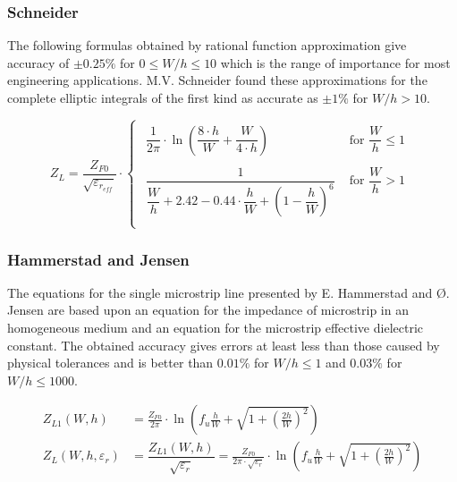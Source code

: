 \documentclass[10pt]{report}
\begin{document}
\subsubsection{Schneider}

The following formulas obtained by rational function approximation
give accuracy of $\pm 0.25\%$ for $0 \le W/h \le 10$ which is the
range of importance for most engineering applications.  M.V. Schneider
\cite{Schneider} found these approximations for the complete elliptic
integrals of the first kind as accurate as $\pm 1\%$ for $W/h > 10$.

\begin{equation}
Z_L = \dfrac{Z_{F0}}{\sqrt{\varepsilon_{r_{eff}}}}\cdot
\begin{cases}
\begin{array}{ll}
\dfrac{1}{2\pi}\cdot \ln{\left(\dfrac{8\cdot h}{W} + \dfrac{W}{4\cdot h}\right)} & \textrm{ for } \dfrac{W}{h} \le 1\\
&\\
\dfrac{1}{\dfrac{W}{h} + 2.42 - 0.44\cdot\dfrac{h}{W} + \left(1 - \dfrac{h}{W}\right)^6} & \textrm{ for } \dfrac{W}{h} > 1\\
\end{array}
\end{cases}
\end{equation}

\subsubsection{Hammerstad and Jensen}

The equations for the single microstrip line presented by
E. Hammerstad and {\O}. Jensen \cite{Hammerstad} are based upon an
equation for the impedance of microstrip in an homogeneous medium and
an equation for the microstrip effective dielectric constant.  The
obtained accuracy gives errors at least less than those caused by
physical tolerances and is better than $0.01\%$ for $W/h \le 1$ and
$0.03\%$ for $W/h \le 1000$.

\begin{align}
\label{eq:HandJZL0}
Z_{L1}\left(W, h\right) &=
\frac{Z_{F0}}{2\pi}\cdot\ln{\left(f_{u}\frac{h}{W} + \sqrt{1 + \left(\frac{2h}{W}\right)^{2}}\right)}\\
\label{eq:HandJZL0Er}
Z_{L}\left(W, h, \varepsilon_{r}\right) &= \dfrac{Z_{L1} \left(W, h\right)}{\sqrt{\varepsilon_{r}}} = \frac{Z_{F0}}{2\pi\cdot\sqrt{\varepsilon_{r}}}\cdot\ln{\left(f_{u}\frac{h}{W} + \sqrt{1 + \left(\frac{2h}{W}\right)^{2}}\right)}
\end{align}
\end{document}
